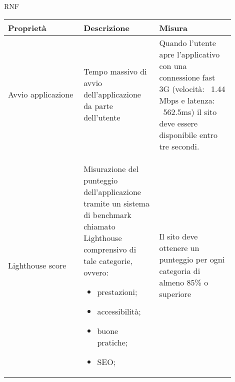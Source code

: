 \begin{listaPersonale}{RNF}
    \begin{tabular}{|p{0.3\linewidth}|p{0.3\linewidth}|p{0.3\linewidth}|}
        \hline
        \rowcolor{viola} \textbf{Proprietà}                           &
        \textbf{Descrizione}                                          &
        \textbf{Misura}                                                                   \\
        \hline
        Avvio applicazione                                            &
        Tempo massivo di avvio dell'applicazione da parte dell'utente &
        Quando l'utente apre l'applicativo con una connessione
        fast 3G (velocità: ~1.44 Mbps e latenza: ~562.5ms)
        il sito deve essere disponibile entro tre secondi.                                \\
        \hline
        Lighthouse score                                              &
        Misurazione del punteggio dell'applicazione tramite un
        sistema di benchmark chiamato Lighthouse comprensivo
        di tale categorie, ovvero:
        \begin{itemize}
            \item prestazioni;
            \item accessibilità;
            \item buone pratiche;
            \item SEO;
        \end{itemize}                                         &
        Il sito deve ottenere un punteggio per ogni categoria di almeno 85\% o superiore \\
        \hline
    \end{tabular}


\end{listaPersonale}
